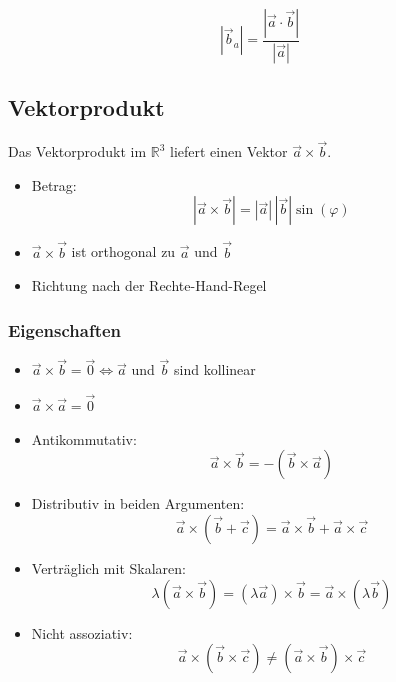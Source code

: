 \[
     |\vec b_a|=\frac{|\vec a \cdot \vec b|}{|\vec a|}
\]


\subsection{Vektorprodukt}

Das Vektorprodukt im $\mathbb{R}^3$ liefert einen Vektor $\vec a \times \vec b$.

\begin{itemize}
     \item Betrag:
           \[
                |\vec a \times \vec b| = |\vec a|\,|\vec b|\sin(\varphi)
           \]
     \item $\vec a \times \vec b$ ist orthogonal zu $\vec a$ und $\vec b$
     \item Richtung nach der Rechte-Hand-Regel
\end{itemize}


\subsubsection{Eigenschaften}

\begin{itemize}
     \item $\vec a \times \vec b = \vec 0 \iff \vec a$ und $\vec b$ sind kollinear
     \item $\vec a \times \vec a = \vec 0$
     \item Antikommutativ:
           \[
                \vec a \times \vec b = -(\vec b \times \vec a)
           \]
     \item Distributiv in beiden Argumenten:
           \[
                \vec a \times (\vec b+\vec c)=\vec a \times \vec b + \vec a \times \vec c
           \]
     \item Verträglich mit Skalaren:
           \[
                \lambda(\vec a\times\vec b)=(\lambda\vec a)\times\vec b=\vec a\times(\lambda\vec b)
           \]
     \item Nicht assoziativ:
           \[
                \vec a\times(\vec b\times\vec c)\neq(\vec a\times\vec b)\times\vec c
           \]
\end{itemize}

